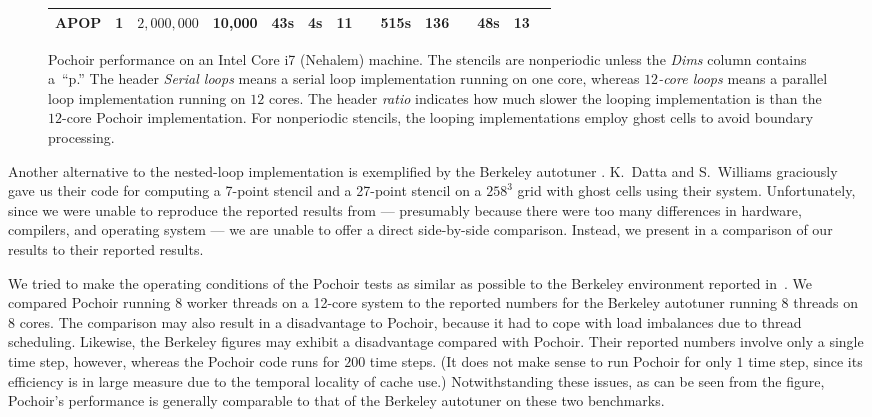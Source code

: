 \begin{figure*}
\begin{tabular}{|llcr|rrr@{.}l|rr@{.}l|rr@{.}l|}
APOP    & 1  & $2,000,000$       &  10,000 &    43s &   4s & 11&   &   515s & 136&  &    48s & 13&   \\
\hline
\end{tabular}
\caption{Pochoir performance on an Intel Core i7 (Nehalem) machine.
  The stencils are nonperiodic unless the \textit{Dims} column
  contains a~``p.''  The header \textit{Serial loops} means a serial
   loop implementation running on one core, whereas
  \textit{$12$-core loops} means a parallel  loop
  implementation running on $12$ cores.  The header \textit{ratio}
  indicates how much slower the looping implementation is than the
  $12$-core Pochoir implementation.  For nonperiodic stencils, the
  looping implementations employ ghost cells \cite{Datta09} to avoid
  boundary processing.}
\label{fig:benchmarks}
\end{figure*}

Another alternative to the nested-loop implementation is exemplified
by the Berkeley autotuner \cite{Datta09,KamilShDa06,WilliamsCaOl08}.
K.~Datta and S.~Williams graciously gave us their code for computing a
7-point stencil and a 27-point stencil on a $258^3$ grid with ghost cells
using their system.  Unfortunately, since we were unable to reproduce the 
reported results from \cite{Datta09} --- presumably because there were 
too many differences in hardware, compilers, and operating system --- 
we are unable to offer a direct side-by-side comparison. Instead, we present
in  a comparison of our results to their reported
results.

We tried to make the operating conditions of the Pochoir tests as
similar as possible to the Berkeley environment reported
in~\cite{Datta09}.  We compared Pochoir running 8 worker threads on a
12-core system to the reported numbers for the Berkeley autotuner
running 8 threads on 8 cores.  The comparison may also result in a
disadvantage to Pochoir, because it had to cope with load imbalances
due to thread scheduling.  Likewise, the Berkeley figures may exhibit
a disadvantage compared with Pochoir.  Their reported numbers involve
only a single time step, however, whereas the Pochoir code runs for
$200$ time steps.  (It does not make sense to run Pochoir for only $1$
time step, since its efficiency is in large measure due to the
temporal locality of cache use.)  Notwithstanding these issues, as can
be seen from the figure, Pochoir's performance is generally comparable
to that of the Berkeley autotuner on these two benchmarks.

